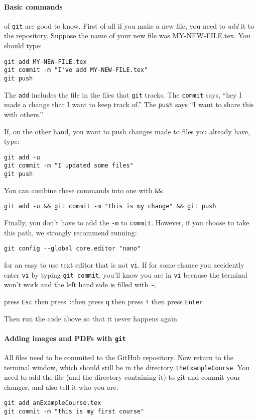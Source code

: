 \documentclass{ximera}
\begin{document}
\paragraph{Basic commands} of \verb!git! are good to know.
First of all if you make a new file, you need to \textit{add} it to the
repository. Suppose the name of your new file was MY-NEW-FILE.tex. You should
type:

\begin{verbatim}
git add MY-NEW-FILE.tex
git commit -m "I've add MY-NEW-FILE.tex"
git push
\end{verbatim}
The \verb!add! includes the file in the files that \verb!git! tracks. The
\verb!commit! says, ``hey I made a change that I want to keep track of.'' The
\verb!push! says ``I want to share this with others.''

If, on the other hand, you want to push changes made to files you already have,
type:
\begin{verbatim}
git add -u
git commit -m "I updated some files"
git push
\end{verbatim}
You can combine these commands into one with \verb!&&!:
\begin{verbatim}
git add -u && git commit -m "this is my change" && git push
\end{verbatim}

Finally, you don't have to add the \verb!-m! to \verb!commit!. However, if you
choose to take this path, we strongly recommend running:
\begin{verbatim}
git config --global core.editor "nano"
\end{verbatim}
for an easy to use text editor that is not \verb!vi!. If for some chance you
accidently enter \verb!vi! by typing \verb!git commit!, you'll know you are in \verb!vi! because the terminal won't work and the left hand side is filled with \verb!~!, 
\begin{center}
press \verb!Esc! \quad then press \verb!:!\quad then press \verb!q! \quad then press \verb#!# \quad then press \verb!Enter!
\end{center}
 Then run the code above so that it never happens again.

\paragraph{Adding images and PDFs with \texttt{git}}

All files need to be commited to the GitHub repository.
Now return to the terminal window, which should still be in the
directory
\verb!theExampleCourse!. You need to add the file (and the directory
containing
it) to git and commit your changes, and also tell it who you are.
\begin{verbatim}
git add anExampleCourse.tex
git commit -m "this is my first course"
\end{verbatim}
\end{document}
